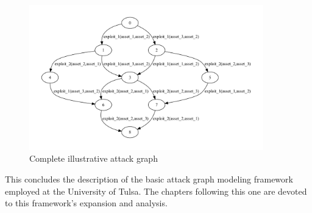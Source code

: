 \begin{figure}
\includegraphics[width=4in]{ag_illustrative_simple/ag_depth5}
\caption{Complete illustrative attack graph}
\label{fig:ill_ag_depth5}
\end{figure}

This concludes the description of the basic attack graph modeling framework 
employed at 
the University of Tulsa. The chapters following this one are devoted to
this framework's expansion and analysis.